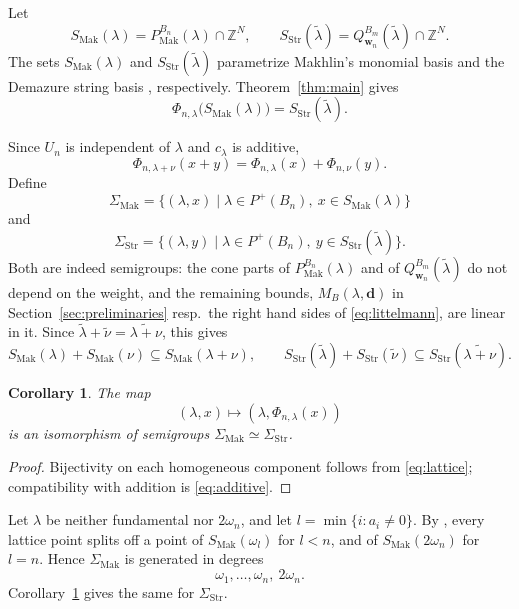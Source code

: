 \documentclass[a4paper, 12pt]{amsart}
\newtheorem{corollary}[theorem]{Corollary}
\newcommand{\Mak}{\mathrm{Mak}}
\newcommand{\Str}{\mathrm{Str}}
\newcommand{\ZZ}{\mathbb Z}
\newcommand{\ww}{\mathbf w}
\begin{document}
Let
\[
 S_{\Mak}(\lambda)=P_{\Mak}^{B_n}(\lambda)\cap\ZZ^N,
 \qquad
 S_{\Str}(\widetilde\lambda)
 =Q_{\ww_n}^{B_m}(\widetilde\lambda)\cap\ZZ^N.
\]
The sets $S_{\Mak}(\lambda)$ and $S_{\Str}(\widetilde\lambda)$ parametrize Makhlin's monomial basis \cite[Theorem~1.1 and Corollary~2.2]{Mak19} and the Demazure string basis \cite{Lit98,BZ01,Cal02}, respectively. Theorem~\ref{thm:main} gives
\begin{equation}\label{eq:lattice}
         \Phi_{n,\lambda}\bigl(S_{\Mak}(\lambda)\bigr)
                  =S_{\Str}(\widetilde\lambda).
\end{equation}

Since $U_n$ is independent of $\lambda$ and $c_\lambda$ is additive,
\begin{equation}\label{eq:additive}
 \Phi_{n,\lambda+\nu}(x+y)
       =\Phi_{n,\lambda}(x)+\Phi_{n,\nu}(y).
\end{equation}
Define
\[
 \Sigma_{\Mak}
   =\{(\lambda,x)\mid \lambda\in P^+(B_n),\ x\in S_{\Mak}(\lambda)\}
\]
and
\[
 \Sigma_{\Str}
   =\{(\lambda,y)\mid \lambda\in P^+(B_n),\
          y\in S_{\Str}(\widetilde\lambda)\}.
\]
Both are indeed semigroups: the cone parts of $P_{\Mak}^{B_n}(\lambda)$ and of
$Q_{\ww_n}^{B_m}(\widetilde\lambda)$ do not depend on the weight, and the remaining
bounds, $M_B(\lambda,\mathbf d)$ in Section~\ref{sec:preliminaries} resp.\ the
right hand sides of \eqref{eq:littelmann}, are linear in it. Since
$\widetilde\lambda+\widetilde\nu=\widetilde{\lambda+\nu}$, this gives
\[
 S_{\Mak}(\lambda)+S_{\Mak}(\nu)\subseteq S_{\Mak}(\lambda+\nu),
 \qquad
 S_{\Str}(\widetilde\lambda)+S_{\Str}(\widetilde\nu)
      \subseteq S_{\Str}(\widetilde{\lambda+\nu}).
\]
\begin{corollary}\label{cor:semigroup}
The map
\[
        (\lambda,x)\longmapsto(\lambda,\Phi_{n,\lambda}(x))
\]
is an isomorphism of semigroups $\Sigma_{\Mak}\simeq\Sigma_{\Str}$.
\end{corollary}

\begin{proof}
Bijectivity on each homogeneous component follows from \eqref{eq:lattice}; compatibility with addition is \eqref{eq:additive}.
\end{proof}

Let $\lambda$ be neither fundamental nor $2\omega_n$, and let $l=\min\{i:a_i\neq0\}$. By \cite[Lemma~5.1]{Mak19}, every lattice point splits off a point of $S_{\Mak}(\omega_l)$ for $l<n$, and of $S_{\Mak}(2\omega_n)$ for $l=n$. Hence $\Sigma_{\Mak}$ is generated in degrees
\[
                       \omega_1,\ldots,\omega_n,\ 2\omega_n.
\]
Corollary~\ref{cor:semigroup} gives the same for $\Sigma_{\Str}$.
\end{document}
